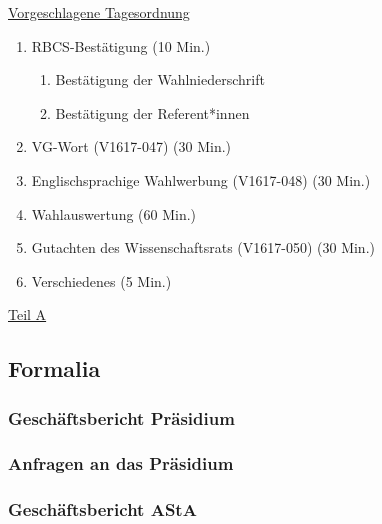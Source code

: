 \documentclass[ngerman,headheight=70pt]{scrartcl}
\begin{document}
    \newpage
    \underline{Vorgeschlagene Tagesordnung}
    \begin{enumerate}[label={\textbf{Top \theenumi}},leftmargin=*]
        \item RBCS-Bestätigung (10 Min.)
        \begin{enumerate}
            \item Bestätigung der Wahlniederschrift
            \item Bestätigung der Referent*innen
        \end{enumerate}
        \item VG-Wort (V1617-047) (30 Min.)
        \item Englischsprachige Wahlwerbung (V1617-048) (30 Min.)
        \item Wahlauswertung (60 Min.)
        \item Gutachten des Wissenschaftsrats (V1617-050) (30 Min.)
        \item Verschiedenes (5 Min.)
    \end{enumerate}

    \newpage


    {\Large \underline{Teil A}}

    \subsection{Formalia}

    \subsubsection{Geschäftsbericht Präsidium}


    \subsubsection{Anfragen an das Präsidium}



    \subsubsection{Geschäftsbericht AStA}
\end{document}
